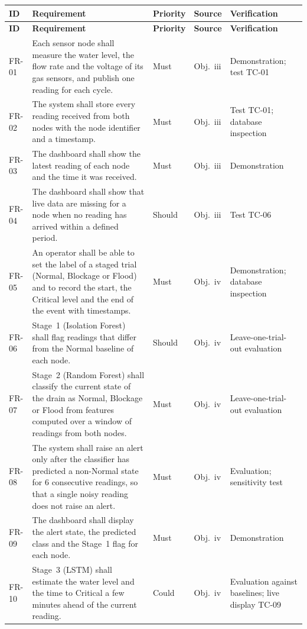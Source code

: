 \documentclass[12pt, a4paper]{article}
\begin{document}
\begin{longtable}{|p{1.3cm}|p{6.0cm}|p{1.5cm}|p{1.3cm}|p{3.0cm}|}
\hline
\textbf{ID} & \textbf{Requirement} & \textbf{Priority} & \textbf{Source} & \textbf{Verification} \\
\hline
\endfirsthead
\hline
\textbf{ID} & \textbf{Requirement} & \textbf{Priority} & \textbf{Source} & \textbf{Verification} \\
\hline
\endhead
FR-01 & Each sensor node shall measure the water level, the flow rate and the voltage of its gas sensors, and publish one reading for each cycle. & Must & Obj.~iii & Demonstration; test TC-01 \\
\hline
FR-02 & The system shall store every reading received from both nodes with the node identifier and a timestamp. & Must & Obj.~iii & Test TC-01; database inspection \\
\hline
FR-03 & The dashboard shall show the latest reading of each node and the time it was received. & Must & Obj.~iii & Demonstration \\
\hline
FR-04 & The dashboard shall show that live data are missing for a node when no reading has arrived within a defined period. & Should & Obj.~iii & Test TC-06 \\
\hline
FR-05 & An operator shall be able to set the label of a staged trial (Normal, Blockage or Flood) and to record the start, the Critical level and the end of the event with timestamps. & Must & Obj.~iv & Demonstration; database inspection \\
\hline
FR-06 & Stage~1 (Isolation Forest) shall flag readings that differ from the Normal baseline of each node. & Should & Obj.~iv & Leave-one-trial-out evaluation \\
\hline
FR-07 & Stage~2 (Random Forest) shall classify the current state of the drain as Normal, Blockage or Flood from features computed over a window of readings from both nodes. & Must & Obj.~iv & Leave-one-trial-out evaluation \\
\hline
FR-08 & The system shall raise an alert only after the classifier has predicted a non-Normal state for 6 consecutive readings, so that a single noisy reading does not raise an alert. & Must & Obj.~iv & Evaluation; sensitivity test \\
\hline
FR-09 & The dashboard shall display the alert state, the predicted class and the Stage~1 flag for each node. & Must & Obj.~iv & Demonstration \\
\hline
FR-10 & Stage~3 (LSTM) shall estimate the water level and the time to Critical a few minutes ahead of the current reading. & Could & Obj.~iv & Evaluation against baselines; live display TC-09 \\

\end{longtable}
\end{document}
